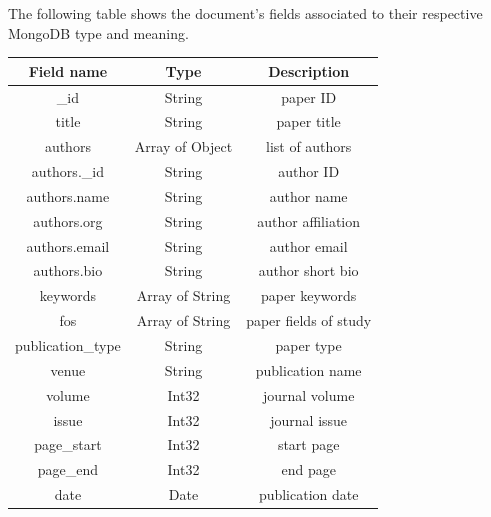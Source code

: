 The following table shows the document's fields associated to their respective MongoDB type and meaning.
\begin{table}[H]
    \begin{center}
        \begin{tabular}{|c|c|c|}
            \hline %
            \textbf{Field name}      & \textbf{Type}   & \textbf{Description} \T\B \\
            \hline \hline
            \_id                     & String          & paper ID\T\B              \\
            title                    & String          & paper title\T\B           \\
            authors                  & Array of Object & list of authors\T\B       \\
            authors.\_id             & String          & author ID\T\B             \\
            authors.name             & String          & author name\T\B           \\
            authors.org              & String          & author affiliation\T\B    \\
            authors.email            & String          & author email\T\B          \\
            authors.bio              & String          & author short bio\T\B      \\
            keywords                 & Array of String & paper keywords\T\B        \\
            fos                      & Array of String & paper fields of study\T\B \\
            publication\_type        & String          & paper type\T\B            \\
            venue                    & String          & publication name\T\B      \\
            volume                   & Int32           & journal volume\T\B        \\
            issue                    & Int32           & journal issue\T\B         \\
            page\_start              & Int32           & start page\T\B            \\
            page\_end                & Int32           & end page\T\B              \\
            date                     & Date            & publication date\T\B      \\

\end{tabular}
\end{center}
\end{table}
